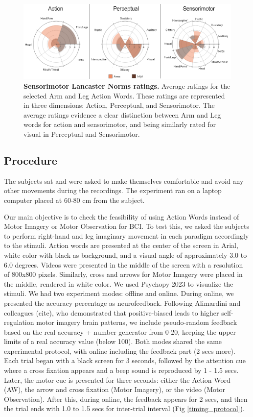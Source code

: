 \documentclass[10pt,letterpaper]{article}
\begin{document}
\begin{figure}[!h]

\includegraphics[width=\textwidth]{Figures/sensorimotor_plot.png}
\caption{{\bf Sensorimotor Lancaster Norms ratings.}
 Average ratings for the selected Arm and Leg Action Words. These ratings are represented in three dimensions: Action, Perceptual, and Sensorimotor. The average ratings evidence a clear distinction between Arm and Leg words for action and sensorimotor, and being similarly rated for visual in Perceptual and Sensorimotor. }
\label{sensorimotor_lancaster}
\end{figure}



\subsection{Procedure}


The subjects sat and were asked to make themselves comfortable and avoid any other movements during the recordings. The experiment ran on a laptop computer placed at 60-80 cm from the subject.

Our main objective is to check the feasibility of using Action Words instead of Motor Imagery or Motor Observation for BCI. To test this, we asked the subjects to perform right-hand and leg imaginary movement in each paradigm accordingly to the stimuli. Action words are presented at the center of the screen in Arial, white color with black as background, and a visual angle of approximately 3.0 to 6.0 degrees. Videos were presented in the middle of the screen with a resolution of 800x800 pixels. Similarly, cross and arrows for Motor Imagery were placed in the middle, rendered in white color. We used Psychopy 2023 to visualize the stimuli. We had two experiment modes: offline and online. During online, we presented the accuracy percentage as neurofeedback. Following Alimardini and colleagues (cite), who demonstrated that positive-biased leads to higher self-regulation motor imagery brain patterns, we include pseudo-random feedback based on the real accuracy + number generator from 0-20, keeping the upper limits of a real accuracy value (below 100). Both modes shared the same experimental protocol, with online including the feedback part (2 secs more). Each trial began with a black screen for 3 seconds, followed by the attention cue where a cross fixation appears and a beep sound is reproduced by 1 - 1.5 secs. Later, the motor cue is presented for three seconds: either the Action Word (AW), the arrow and cross fixation (Motor Imagery), or the video (Motor Observation). After this, during online, the feedback appears for 2 secs, and then the trial ends with 1.0 to 1.5 secs for inter-trial interval (Fig \ref{timing_protocol}).
\end{document}
